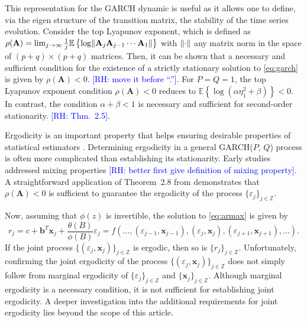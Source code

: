\documentclass[10pt,a4paper,oneside]{article}
\newcommand{\Z}{\mathbb{Z}}
\newcommand{\E}{\mathbb{E}}
\newcommand{\rh}[1]{\textcolor{blue}{\textsf{[RH: #1]}}}
\DeclarePairedDelimiter{\norma}{\lVert}{\rVert} %
\begin{document}
This representation for the GARCH dynamic is useful as it allows one to define, via the eigen structure of the transition matrix, the stability of the time series evolution. Consider the top Lyapunov exponent, which is defined as $\rho(\mathbf{A}) = \lim_{j \rightarrow \infty} \frac{1}{j} \E \left \{  \log\norma{\mathbf{A}_j \mathbf{A}_{j - 1} \cdots \mathbf{A}_1} \right \}$ with $\norma{\cdot}$ any matrix norm in the space of $(p + q) \times (p + q)$ matrices. Then, it can be shown that a necessary and sufficient condition for the existence of a strictly stationary solution to \eqref{eq:garch} is given by $\rho(\mathbf{A}) < 0$. \citep[thm.~2.4.]{francq2019garch} \rh{move it before ``.''}. For $P = Q = 1$, the top Lyapunov exponent condition $\rho(\mathbf{A}) < 0$ reduces to $\E \left\{ \log \left( \alpha \eta_1^2 + \beta \right) \right\} < 0$. In contrast, the condition $\alpha + \beta < 1$ is necessary and sufficient for second-order stationarity. \citep[thm.~2.5]{francq2019garch} \rh{Thm.~2.5}.

Ergodicity is an important property that helps ensuring desirable properties of statistical estimators \citep[see~p.~367]{francq2019garch}. Determining ergodicity in a general GARCH(\(P\), \(Q\)) process is often more complicated than establishing its stationarity. Early studies addressed mixing properties \cite{boussama1998ergodicite, carrasco2002mixing} \rh{better first give definition of mixing property}. A straightforward application of Theorem~2.8 from \cite{straumann_quasi-maximum-likelihood_2006} demonstrates that \(\rho(\mathbf{A}) < 0\) is sufficient to guarantee the ergodicity of the process \(\{\varepsilon_j\}_{j \in \mathbb{Z}}\).

Now, assuming that $\phi(z)$ is invertible, the solution to \eqref{eq:armax} is given by
$$
    r_j = c +  \mathbf{b}^T \mathbf{x}_j + \frac{\theta(B)}{\phi(B)} \varepsilon_j = f(\dots, (\varepsilon_{j - 1}, \mathbf{x}_{j - 1}), (\varepsilon_{j}, \mathbf{x}_{j}), (\varepsilon_{j + 1}, \mathbf{x}_{j + 1}), \dots).
$$
If the joint process $\{ (\varepsilon_j, \mathbf{x}_j) \}_{j \in \Z}$ is ergodic, then so is $\{ r_j \}_{j \in \Z}$. Unfortunately, confirming the joint ergodicity of the process \(\{(\varepsilon_j, \mathbf{x}_j)\}_{j \in \mathbb{Z}}\) does not simply follow from marginal ergodicity of \(\{\varepsilon_j\}_{j \in \mathbb{Z}}\) and \(\{\mathbf{x}_j\}_{j \in \mathbb{Z}}\). Although marginal ergodicity is a necessary condition, it is not sufficient for establishing joint ergodicity. A deeper investigation into the additional requirements for joint ergodicity lies beyond the scope of this article.
\end{document}
